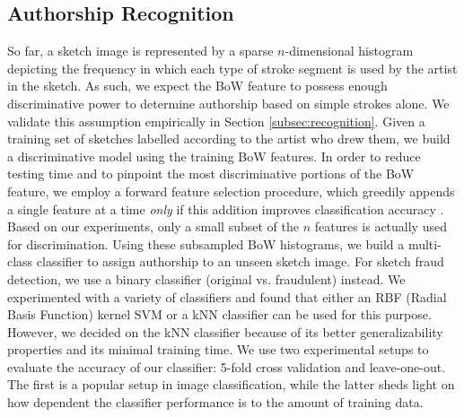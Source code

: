 
\vspace{-2mm}
\subsection{Authorship Recognition}
\vspace{-2mm}
So far, a sketch image is represented by a sparse $n$-dimensional histogram depicting the frequency in which each type of stroke segment is used by the artist in the sketch. As such, we expect the BoW feature to possess enough discriminative power to determine authorship based on simple strokes alone. We validate this assumption empirically in Section \ref{subsec:recognition}. Given a training set of sketches labelled according to the artist who drew them, we build a discriminative model using the training BoW features. In order to reduce testing time and to pinpoint the most discriminative portions of the BoW feature, we employ a forward feature selection procedure, which greedily appends a single feature at a time \emph{only} if this addition improves classification accuracy \cite{574797}. Based on our experiments, only a small subset of the $n$ features is actually used for discrimination. Using these subsampled BoW histograms, we build a multi-class classifier to assign authorship to an unseen sketch image. For sketch fraud detection, we use a binary classifier (original vs. fraudulent) instead. We experimented with a variety of classifiers and found that either an RBF (Radial Basis Function) kernel SVM or a kNN classifier can be used for this purpose. However, we decided on the kNN classifier because of its better generalizability properties and its minimal training time. We use two experimental setups to evaluate the accuracy of our classifier: 5-fold cross validation and leave-one-out. The first is a popular setup in image classification, while the latter sheds light on how dependent the classifier performance is to the amount of training data.






